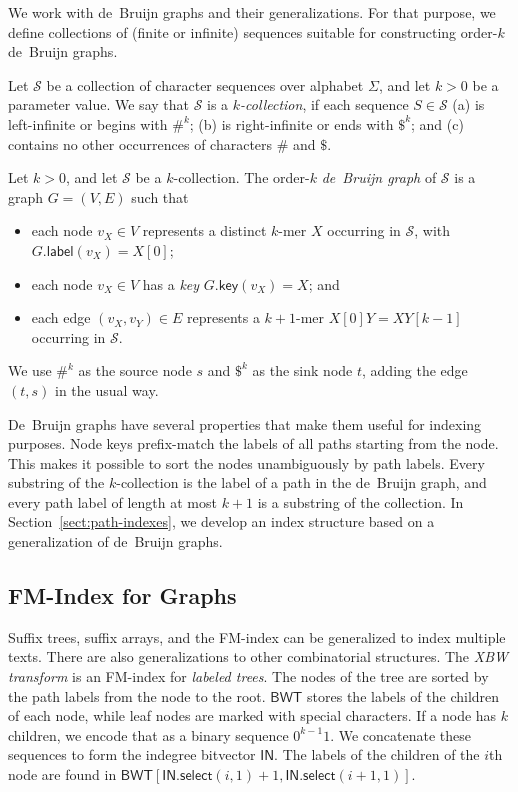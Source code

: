 \documentclass[twoside,leqno,twocolumn]{article}
\newcommand{\select}{\ensuremath{\mathsf{select}}}
\newcommand{\glabel}{\ensuremath{\mathsf{label}}}
\newcommand{\gkey}{\ensuremath{\mathsf{key}}}
\newcommand{\kmer}[1]{$#1$\nobreakdash-mer}
\newcommand{\kcollection}[1]{$#1$\nobreakdash-collection}
\newcommand{\orderk}[1]{order\nobreakdash-$#1$}
\newcommand{\FMindex}{FM\nobreakdash-index}
\newcommand{\BWT}{\ensuremath{\mathsf{BWT}}}
\newcommand{\bvIN}{\ensuremath{\mathsf{IN}}}
\begin{document}
We work with de~Bruijn graphs and their generalizations. For that purpose, we define collections of (finite or infinite) sequences suitable for constructing \orderk{k} de~Bruijn graphs.

\begin{Definition}[\kcollection{k}]
Let $\mathcal{S}$ be a collection of character sequences over alphabet $\Sigma$, and let $k > 0$ be a parameter value. We say that $\mathcal{S}$ is a \emph{\kcollection{k}}, if each sequence $S \in \mathcal{S}$
(a) is left-infinite or begins with $\#^{k}$;
(b) is right-infinite or ends with $\$^{k}$; and
(c) contains no other occurrences of characters $\#$ and $\$$.
\end{Definition}

\begin{Definition}
Let $k > 0$, and let $\mathcal{S}$ be a \kcollection{k}. The \orderk{k} \emph{de~Bruijn graph} of $\mathcal{S}$ is a graph $G = (V, E)$ such that
\begin{itemize}
\item each node $v_{X} \in V$ represents a distinct \kmer{k} $X$ occurring in $\mathcal{S}$, with $G.\glabel(v_{X}) = X[0]$;
\item each node $v_{X} \in V$ has a \emph{key} $G.\gkey(v_{X}) = X$; and
\item each edge $(v_{X}, v_{Y}) \in E$ represents a \kmer{k+1} $X[0]Y = XY[k-1]$ occurring in $\mathcal{S}$.
\end{itemize}
We use $\#^{k}$ as the source node $s$ and $\$^{k}$ as the sink node $t$, adding the edge $(t, s)$ in the usual way.
\end{Definition}

De~Bruijn graphs have several properties that make them useful for indexing purposes. Node keys prefix-match the labels of all paths starting from the node. This makes it possible to sort the nodes unambiguously by path labels. Every substring of the \kcollection{k} is the label of a path in the de~Bruijn graph, and every path label of length at most $k+1$ is a substring of the collection. In Section~\ref{sect:path-indexes}, we develop an index structure based on a generalization of de~Bruijn graphs.

\subsection{FM-Index for Graphs}

Suffix trees, suffix arrays, and the \FMindex{} can be generalized to index multiple texts. There are also generalizations to other combinatorial structures. The \emph{XBW transform} \cite{Ferragina2009b} is an \FMindex{} for \emph{labeled trees}. The nodes of the tree are sorted by the path labels from the node to the root. $\BWT$ stores the labels of the children of each node, while leaf nodes are marked with special characters. If a node has $k$ children, we encode that as a binary sequence $0^{k-1} 1$. We concatenate these sequences to form the indegree bitvector $\bvIN$. The labels of the children of the $i$th node are found in $\BWT[\bvIN.\select(i, 1) + 1, \bvIN.\select(i + 1, 1)]$.
\end{document}
